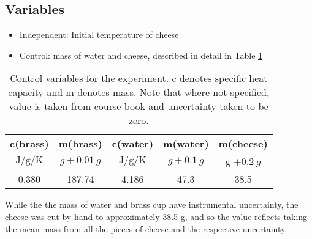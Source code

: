 \subsection{Variables}
\begin{itemize}
	\item Independent: Initial temperature of cheese
	\item Control: mass of water and cheese, described in detail in Table \ref{tb:ControlVariables}
\end{itemize}
\begin{table} [h]
	\centering
	\begin{tabular} {c|c|c|c|c}
		\textbf{c(brass)} & \textbf{m(brass)} & \textbf{c(water)} & \textbf{m(water)} & \textbf{m(cheese)} \\
		$\si{\joule\per\gram\per\kelvin}$ & $\si{g} \pm \SI{0.01}{g}$ & $\si{\joule\per\gram\per\kelvin}$ & $ \si{g} \pm \SI{0.1}{g}$ & g $\pm \SI{0.2}{g}$\\ \hline
		0.380 & 187.74 & 4.186 & 47.3 & 38.5
	\end{tabular}
	\caption{Control variables for the experiment. c denotes specific heat capacity and m denotes mass. Note that where not specified, value is taken from course book \citep{IBPhysics} and uncertainty taken to be zero.}
	\label{tb:ControlVariables}
\end{table}

While the the mass of water and brass cup have instrumental uncertainty, the cheese was cut by hand to approximately 38.5 g, and so the value reflects taking the mean mass from all the pieces of cheese and the respective uncertainty.
